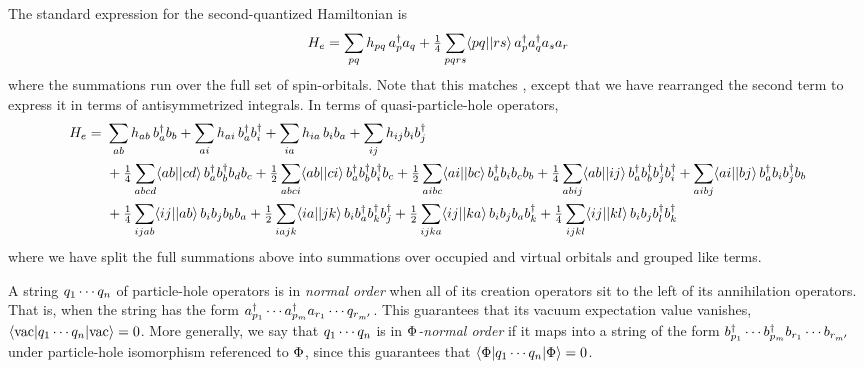 \documentclass[11pt]{article}
\numberwithin{equation}{section}
\begin{document}
\begin{rmk}
The standard expression for the second-quantized Hamiltonian is
\begin{align}
  H_e
=
  \sum_{pq}
  h_{pq}\,
  a_p^\dagger a_q
+
  \tfrac{1}{4}
  \sum_{pqrs}
  \langle pq||rs\rangle\,
  a_p^\dagger a_q^\dagger a_sa_r
\end{align}
where the summations run over the full set of spin-orbitals.
Note that this matches , except that we have rearranged the second term to express it in terms of antisymmetrized integrals.
In terms of quasi-particle-hole operators,
\begin{align}
\nonumber
  H_e
=&\
  \sum_{ab}
  h_{ab}\,
  b_a^\dagger b_b
+
  \sum_{ai}
  h_{ai}\,
  b_a^\dagger b_i^\dagger
+
  \sum_{ia}
  h_{ia}\,
  b_i b_a
+
  \sum_{ij}
  h_{ij}
  b_i b_j^\dagger
\\\nonumber&\
+
  \tfrac{1}{4}
  \sum_{abcd}
  \langle ab||cd\rangle\,
  b_a^\dagger b_b^\dagger b_d b_c
+
  \tfrac{1}{2}
  \sum_{abci}
  \langle ab||ci\rangle\,
  b_a^\dagger b_b^\dagger b_i^\dagger b_c
+
  \tfrac{1}{2}
  \sum_{aibc}
  \langle ai||bc\rangle\,
  b_a^\dagger b_i b_c b_b
+
  \tfrac{1}{4}
  \sum_{abij}
  \langle ab||ij\rangle\,
  b_a^\dagger b_b^\dagger b_j^\dagger b_i^\dagger
+
  \sum_{aibj}
  \langle ai||bj\rangle\,
  b_a^\dagger b_i b_j^\dagger b_b
\\&\
+
  \tfrac{1}{4}
  \sum_{ijab}
  \langle ij||ab\rangle\,
  b_i b_j b_b b_a
+
  \tfrac{1}{2}
  \sum_{iajk}
  \langle ia||jk\rangle\,
  b_i b_a^\dagger b_k^\dagger b_j^\dagger
+
  \tfrac{1}{2}
  \sum_{ijka}
  \langle ij||ka\rangle\,
  b_i b_j b_a b_k^\dagger
+
  \tfrac{1}{4}
  \sum_{ijkl}
  \langle ij||kl\rangle\,
  b_i b_j b_l^\dagger b_k^\dagger
\end{align}
where we have split the full summations above into summations over occupied and virtual orbitals and grouped like terms.
\end{rmk}

\begin{dfn}
A string $q_1\cdots q_n$ of particle-hole operators is in \textit{normal order} when all of its creation operators sit to the left of its annihilation operators.
That is, when the string has the form $a_{p_1}^\dagger\cdots a_{p_m}^\dagger a_{r_1}\cdots q_{r_{m'}}$.
This guarantees that its vacuum expectation value vanishes, $\langle\mathrm{vac}|q_1\cdots q_n|\mathrm{vac}\rangle=0$.
More generally, we say that $q_1\cdots q_n$ is in \textit{$\Phi $-normal order} if it maps into a string of the form $b_{p_1}^\dagger\cdots b_{p_m}^\dagger b_{r_1}\cdots b_{r_{m'}}$ under particle-hole isomorphism referenced to $\Phi $, since this guarantees that
$\langle\Phi |q_1\cdots q_n|\Phi \rangle=0$.
\end{dfn}
\end{document}
